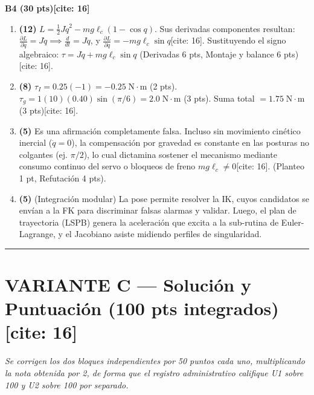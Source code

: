 \documentclass[11pt, a4paper]{article}
\begin{document}
\textbf{B4 (30 pts)[cite: 16]}
\begin{enumerate}\footnotesize
    \item \textbf{(12)} $L = \frac{1}{2}J\dot{q}^2 - mg\ell_c(1-\cos q)$. Sus derivadas componentes resultan: $\frac{\partial L}{\partial \dot{q}} = J\dot{q} \implies \frac{d}{dt} = J\ddot{q}$, y $\frac{\partial L}{\partial q} = -mg\ell_c\sin q$[cite: 16]. Sustituyendo el signo algebraico: $\tau = J\ddot{q} + mg\ell_c\sin q$ (Derivadas 6 pts, Montaje y balance 6 pts)[cite: 16].
    \item \textbf{(8)} $\tau_I = 0.25(-1) = -0.25\;\mathrm{N\cdot m}$ (2 pts). $\tau_g = 1(10)(0.40)\sin(\pi/6) = 2.0\;\mathrm{N\cdot m}$ (3 pts). Suma total $= 1.75\;\mathrm{N\cdot m}$ (3 pts)[cite: 16].
    \item \textbf{(5)} Es una afirmación completamente falsa. Incluso sin movimiento cinético inercial ($\ddot{q}=0$), la compensación por gravedad es constante en las posturas no colgantes (ej. $\pi/2$), lo cual dictamina sostener el mecanismo mediante consumo continuo del servo o bloqueos de freno $mg\ell_c \neq 0$[cite: 16]. (Planteo 1 pt, Refutación 4 pts).
    \item \textbf{(5)} (Integración modular) La pose permite resolver la IK, cuyos candidatos se envían a la FK para discriminar falsas alarmas y validar. Luego, el plan de trayectoria (LSPB) genera la aceleración que excita a la sub-rutina de Euler-Lagrange, y el Jacobiano asiste midiendo perfiles de singularidad.
\end{enumerate}

\vspace{0.3cm}
\hrule
\vspace{0.3cm}

\section*{VARIANTE C — Solución y Puntuación (100 pts integrados)[cite: 16]}
\textit{Se corrigen los dos bloques independientes por 50 puntos cada uno, multiplicando la nota obtenida por 2, de forma que el registro administrativo califique U1 sobre 100 y U2 sobre 100 por separado.}
\end{document}
